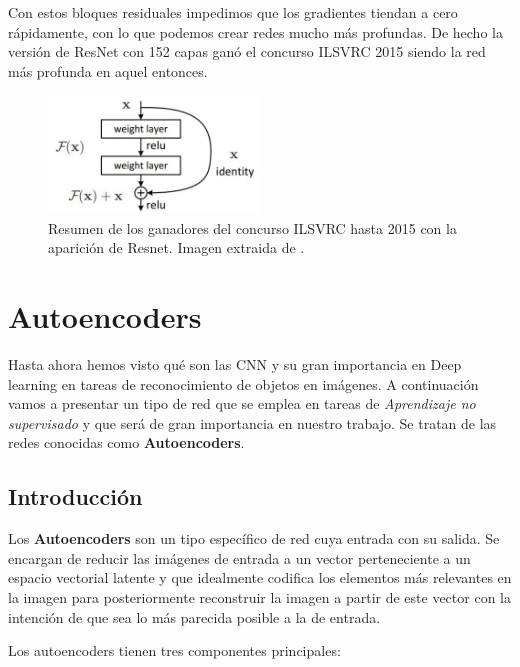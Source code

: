         \noindent Con estos bloques residuales impedimos que los gradientes tiendan a cero rápidamente, con lo que podemos crear redes mucho más profundas. De hecho la versión de ResNet con 152 capas ganó el concurso ILSVRC 2015 siendo la red más profunda en aquel entonces. 

        \begin{figure}[!h]
            \centering
            \includegraphics[width=0.5\textwidth]{img/resnet_module.jpeg}
            \caption{Resumen de los ganadores del concurso ILSVRC hasta 2015 con la aparición de Resnet. Imagen extraida de \cite{StanfordCourse}.}
            \label{fig:ImageNet}
        \end{figure}


\section{Autoencoders}
    \noindent Hasta ahora hemos visto qué son las CNN y su gran importancia en Deep learning en tareas de reconocimiento de objetos en imágenes. A continuación vamos a presentar un tipo de red que se emplea en tareas de \textit{Aprendizaje no supervisado} y que será de gran importancia en nuestro trabajo. Se tratan de las redes conocidas como \textbf{Autoencoders}.

    \subsection{Introducción}
        \noindent Los \textbf{Autoencoders} \cite{autoencoders2017} son un tipo específico de red cuya entrada  con su salida. Se encargan de reducir las imágenes de entrada a un vector perteneciente a un espacio vectorial latente y que idealmente codifica los elementos más relevantes en la imagen para posteriormente reconstruir la imagen a partir de este vector con la intención de que sea lo más parecida posible a la de entrada.

        \medskip

        \noindent Los autoencoders tienen tres componentes principales: 

